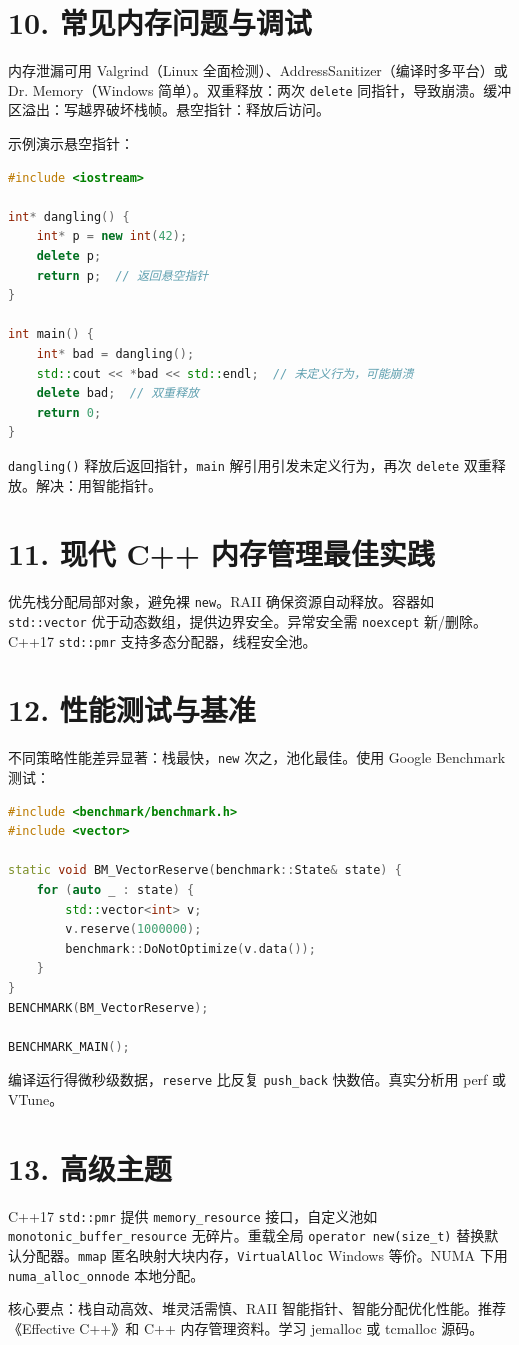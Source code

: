 \chapter{10. 常见内存问题与调试}
内存泄漏可用 Valgrind（Linux 全面检测）、AddressSanitizer（编译时多平台）或 Dr. Memory（Windows 简单）。双重释放：两次 \texttt{delete} 同指针，导致崩溃。缓冲区溢出：写越界破坏栈帧。悬空指针：释放后访问。\par
示例演示悬空指针：\par
\begin{lstlisting}[language=cpp]
#include <iostream>

int* dangling() {
    int* p = new int(42);
    delete p;
    return p;  // 返回悬空指针
}

int main() {
    int* bad = dangling();
    std::cout << *bad << std::endl;  // 未定义行为，可能崩溃
    delete bad;  // 双重释放
    return 0;
}
\end{lstlisting}
\texttt{dangling()} 释放后返回指针，\texttt{main} 解引用引发未定义行为，再次 \texttt{delete} 双重释放。解决：用智能指针。\par
\chapter{11. 现代 C++ 内存管理最佳实践}
优先栈分配局部对象，避免裸 \texttt{new}。RAII 确保资源自动释放。容器如 \texttt{std::vector} 优于动态数组，提供边界安全。异常安全需 \texttt{noexcept} 新/删除。C++17 \texttt{std::pmr} 支持多态分配器，线程安全池。\par
\chapter{12. 性能测试与基准}
不同策略性能差异显著：栈最快，\texttt{new} 次之，池化最佳。使用 Google Benchmark 测试：\par
\begin{lstlisting}[language=cpp]
#include <benchmark/benchmark.h>
#include <vector>

static void BM_VectorReserve(benchmark::State& state) {
    for (auto _ : state) {
        std::vector<int> v;
        v.reserve(1000000);
        benchmark::DoNotOptimize(v.data());
    }
}
BENCHMARK(BM_VectorReserve);

BENCHMARK_MAIN();
\end{lstlisting}
编译运行得微秒级数据，\texttt{reserve} 比反复 \texttt{push\_{}back} 快数倍。真实分析用 perf 或 VTune。\par
\chapter{13. 高级主题}
C++17 \texttt{std::pmr} 提供 \texttt{memory\_{}resource} 接口，自定义池如 \texttt{monotonic\_{}buffer\_{}resource} 无碎片。重载全局 \texttt{operator new(size\_{}t)} 替换默认分配器。\texttt{mmap} 匿名映射大块内存，\texttt{VirtualAlloc} Windows 等价。NUMA 下用 \texttt{numa\_{}alloc\_{}onnode} 本地分配。\par
核心要点：栈自动高效、堆灵活需慎、RAII 智能指针、智能分配优化性能。推荐《Effective C++》和 C++ 内存管理资料。学习 jemalloc 或 tcmalloc 源码。\par
